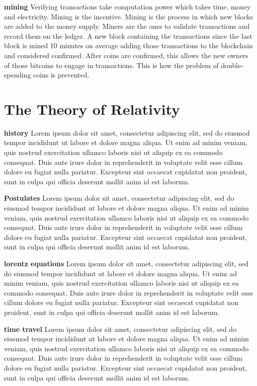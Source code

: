 \documentclass[conference]{IEEEtran}
\begin{document}
\textbf{mining} Verifying transactions take computation power which takes time, money and electricity. Mining is the incentive. Mining is the process in which new blocks are added to the money supply. Miners are the ones to validate transactions and record them on the ledger. A new block containing the transactions since the last block is mined 10 minutes on average adding those transactions to the blockchain and considered confirmed. After coins are confirmed, this allows the new owners of those bitcoins to engage in transactions. This is how the problem of double-spending coins is prevented. 

\section{The Theory of Relativity}
\textbf{history} Lorem ipsum dolor sit amet, consectetur adipiscing elit, sed do eiusmod tempor incididunt ut labore et dolore magna aliqua. Ut enim ad minim veniam, quis nostrud exercitation ullamco laboris nisi ut aliquip ex ea commodo consequat. Duis aute irure dolor in reprehenderit in voluptate velit esse cillum dolore eu fugiat nulla pariatur. Excepteur sint occaecat cupidatat non proident, sunt in culpa qui officia deserunt mollit anim id est laborum.

\textbf{Postulates} Lorem ipsum dolor sit amet, consectetur adipiscing elit, sed do eiusmod tempor incididunt ut labore et dolore magna aliqua. Ut enim ad minim veniam, quis nostrud exercitation ullamco laboris nisi ut aliquip ex ea commodo consequat. Duis aute irure dolor in reprehenderit in voluptate velit esse cillum dolore eu fugiat nulla pariatur. Excepteur sint occaecat cupidatat non proident, sunt in culpa qui officia deserunt mollit anim id est laborum.

\textbf{lorentz equations} Lorem ipsum dolor sit amet, consectetur adipiscing elit, sed do eiusmod tempor incididunt ut labore et dolore magna aliqua. Ut enim ad minim veniam, quis nostrud exercitation ullamco laboris nisi ut aliquip ex ea commodo consequat. Duis aute irure dolor in reprehenderit in voluptate velit esse cillum dolore eu fugiat nulla pariatur. Excepteur sint occaecat cupidatat non proident, sunt in culpa qui officia deserunt mollit anim id est laborum.

\textbf{time travel} Lorem ipsum dolor sit amet, consectetur adipiscing elit, sed do eiusmod tempor incididunt ut labore et dolore magna aliqua. Ut enim ad minim veniam, quis nostrud exercitation ullamco laboris nisi ut aliquip ex ea commodo consequat. Duis aute irure dolor in reprehenderit in voluptate velit esse cillum dolore eu fugiat nulla pariatur. Excepteur sint occaecat cupidatat non proident, sunt in culpa qui officia deserunt mollit anim id est laborum.
\end{document}
